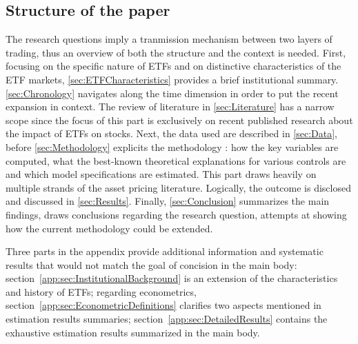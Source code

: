 \subsection{Structure of the paper}
The research questions imply a tranmission mechanism between two layers of trading, thus an overview of both the structure and the context is needed. First, focusing on the specific nature of ETFs and on distinctive characteristics of the ETF markets, \autoref{sec:ETFCharacteristics} provides a brief institutional summary. \autoref{sec:Chronology} navigates along the time dimension in order to put the recent expansion in context. The review of literature in \autoref{sec:Literature} has a narrow scope since the focus of this part is exclusively on recent published research about the impact of ETFs on stocks. Next, the data used are described in \autoref{sec:Data}, before \autoref{sec:Methodology} explicits the methodology : how the key variables are computed, what the best-known theoretical explanations for various controls are and which model specifications are estimated. This part draws heavily on multiple strands of the asset pricing literature. Logically, the outcome is disclosed and discussed in \autoref{sec:Results}. Finally, \autoref{sec:Conclusion} summarizes the main findings, draws conclusions regarding the research question, attempts at showing how the current methodology could be extended.

Three parts in the appendix provide additional information and systematic results that would not match the goal of concision in the main body: section~\autoref{app:sec:InstitutionalBackground} is an extension of the characteristics and history of ETFs; regarding econometrics, section~\autoref{app:sec:EconometricDefinitions} clarifies two aspects mentioned in estimation results summaries; section~\autoref{app:sec:DetailedResults} contains the exhaustive estimation results summarized in the main body.
